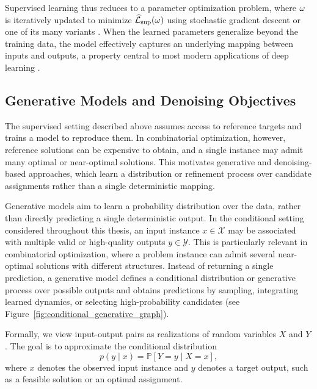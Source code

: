 Supervised learning thus reduces to a parameter optimization problem, where $\omega$ is iteratively updated to minimize $\widehat{\mathcal{L}}_{\mathrm{sup}}(\omega)$ using stochastic gradient descent or one of its many variants \cite{goodfellow_deep_2016,kingma_adam_2014}. When the learned parameters generalize beyond the training data, the model effectively captures an underlying mapping between inputs and outputs, a property central to most modern applications of deep learning \cite{vapnik_nature_2000,bishop_pattern_2006}.

\subsection{Generative Models and Denoising Objectives}
\label{sec:generative_denoising}

The supervised setting described above assumes access to reference targets and trains a model to reproduce them. In combinatorial optimization, however, reference solutions can be expensive to obtain, and a single instance may admit many optimal or near-optimal solutions. This motivates generative and denoising-based approaches, which learn a distribution or refinement process over candidate assignments rather than a single deterministic mapping.

Generative models aim to learn a probability distribution over the data, rather than directly predicting a single deterministic output. In the conditional setting considered throughout this thesis, an input instance $x \in \mathcal{X}$ may be associated with multiple valid or high-quality outputs $y \in \mathcal{Y}$. This is particularly relevant in combinatorial optimization, where a problem instance can admit several near-optimal solutions with different structures. Instead of returning a single prediction, a generative model defines a conditional distribution or generative process over possible outputs and obtains predictions by sampling, integrating learned dynamics, or selecting high-probability candidates (see Figure~\ref{fig:conditional_generative_graph}).

Formally, we view input-output pairs as realizations of random variables $X$ and $Y$. The goal is to approximate the conditional distribution
\begin{equation}
    p(y \mid x) = \mathbb{P}\left[ Y = y \mid X = x \right],
\end{equation}
where $x$ denotes the observed input instance and $y$ denotes a target output, such as a feasible solution or an optimal assignment.

